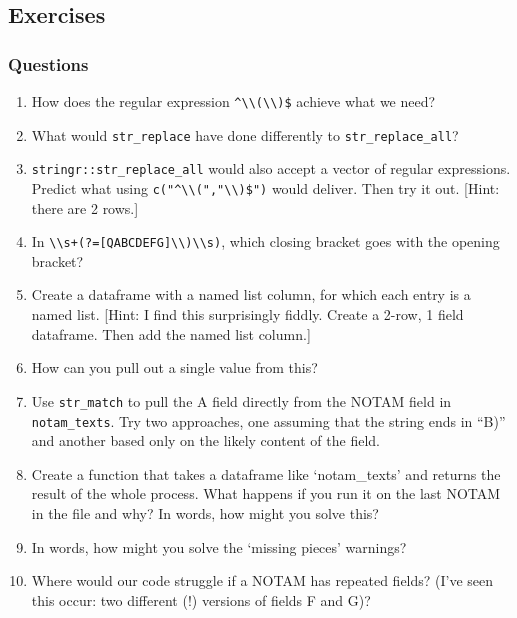 \documentclass[
]{book}
\providecommand{\tightlist}{%
  \setlength{\itemsep}{0pt}\setlength{\parskip}{0pt}}
\begin{document}
\hypertarget{exercises-10}{%
\subsection{Exercises}\label{exercises-10}}

\hypertarget{questions-14}{%
\subsubsection{Questions}\label{questions-14}}

\begin{enumerate}
\def\labelenumi{\arabic{enumi})}
\tightlist
\item
  How does the regular expression \texttt{\^{}\textbackslash{}\textbackslash{}(\textbar{}\textbackslash{}\textbackslash{})\$} achieve what we need?
\item
  What would \texttt{str\_replace} have done differently to \texttt{str\_replace\_all}?
\item
  \texttt{stringr::str\_replace\_all} would also accept a vector of regular expressions. Predict what using \texttt{c("\^{}\textbackslash{}\textbackslash{}(","\textbackslash{}\textbackslash{})\$")} would deliver. Then try it out. {[}Hint: there are 2 rows.{]}
\item
  In \texttt{\textbackslash{}\textbackslash{}s+(?={[}QABCDEFG{]}\textbackslash{}\textbackslash{})\textbackslash{}\textbackslash{}s)}, which closing bracket goes with the opening bracket?
\item
  Create a dataframe with a named list column, for which each entry is a named list. {[}Hint: I find this surprisingly fiddly. Create a 2-row, 1 field dataframe. Then add the named list column.{]}
\item
  How can you pull out a single value from this?
\item
  Use \texttt{str\_match} to pull the A field directly from the NOTAM field in \texttt{notam\_texts}. Try two approaches, one assuming that the string ends in ``B)'' and another based only on the likely content of the field.
\item
  Create a function that takes a dataframe like `notam\_texts' and returns the result of the whole process. What happens if you run it on the last NOTAM in the file and why? In words, how might you solve this?
\item
  In words, how might you solve the `missing pieces' warnings?
\item
  Where would our code struggle if a NOTAM has repeated fields? (I've seen this occur: two different (!) versions of fields F and G)?
\end{enumerate}
\end{document}
